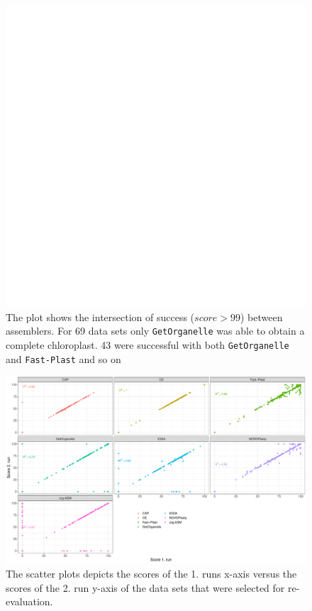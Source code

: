 \documentclass{bmcart}
\newcommand{\formatprogramnames}[1]{\texttt{#1}}
\newcommand{\fp}{\formatprogramnames{Fast-Plast}}
\newcommand{\go}{\formatprogramnames{GetOrganelle}}
\begin{document}
\begin{backmatter}
\begin{figure}[h!]
  \includegraphics[width=\textwidth,page=2]{plots/upset.pdf}
  \caption{
      The plot shows the intersection of success ($score > 99$) between assemblers. For \num{69} data sets only \go{} was able to obtain a complete chloroplast. \num{43} were successful with both \go{} and \fp{} and so on}
            \label{fig:upset}
      \end{figure}

\begin{figure}[h!]
  \includegraphics[width=\textwidth]{plots/repro.pdf}
  \caption{
  The scatter plots depicts the scores of the 1. runs x-axis versus the scores of the 2. run y-axis of the data sets that were selected for re-evaluation. 
      }
      \label{fig:consistency}
      \end{figure}


\end{backmatter}
\end{document}
